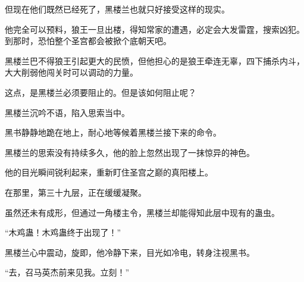 \begin{this_body}
但现在他们既然已经死了，黑楼兰也就只好接受这样的现实。

他完全可以预料，狼王一旦出楼，得知常家的遭遇，必定会大发雷霆，搜索凶犯。到那时，恐怕整个圣宫都会被掀个底朝天吧。

黑楼兰巴不得狼王引起更大的民愤，但他担心的是狼王牵连无辜，四下捕杀内斗，大大削弱他闯关时可以调动的力量。

这点，是黑楼兰必须要阻止的。但是该如何阻止呢？

黑楼兰沉吟不语，陷入思索当中。

黑书静静地跪在地上，耐心地等候着黑楼兰接下来的命令。

黑楼兰的思索没有持续多久，他的脸上忽然出现了一抹惊异的神色。

他的目光瞬间锐利起来，重新盯住圣宫之巅的真阳楼上。

在那里，第三十九层，正在缓缓凝聚。

虽然还未有成形，但通过一角楼主令，黑楼兰却能得知此层中现有的蛊虫。

“木鸡蛊！木鸡蛊终于出现了！”

黑楼兰心中震动，旋即，他冷静下来，目光如冷电，转身注视黑书。

“去，召马英杰前来见我。立刻！”

\end{this_body}

